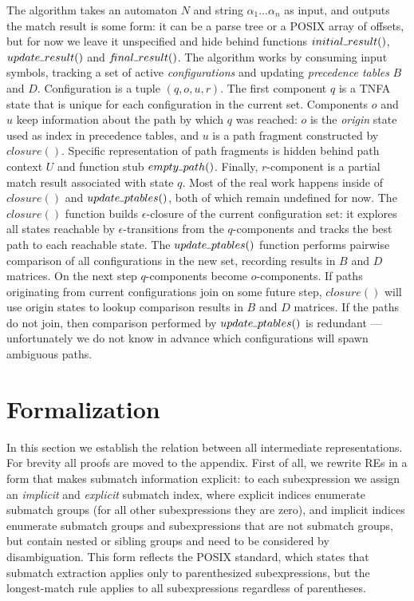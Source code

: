 \documentclass[AMA,STIX1COL]{WileyNJD-v2}
\newcommand{\Xund}{\rule{.4em}{.4pt}}
\begin{document}
The algorithm takes an automaton $N$ and string $\alpha_1 \!\hdots\! \alpha_n$ as input,
and outputs the match result is some form: it can be a parse tree or a POSIX array of offsets,
but for now we leave it unspecified and hide behind functions
$initial \Xund result ()$, $update \Xund result ()$ and $f\!inal \Xund result ()$.
The algorithm works by consuming input symbols,
tracking a set of active \emph{configurations}
and updating \emph{precedence tables} $B$ and $D$.
Configuration is a tuple $(q, o, u, r)$.
The first component $q$ is a TNFA state that is unique for each configuration in the current set.
Components $o$ and $u$ keep information about the path by which $q$ was reached:
$o$ is the \emph{origin} state used as index in precedence tables,
and $u$ is a path fragment constructed by $closure()$.
Specific representation of path fragments is hidden behind path context $U$ and function stub $empty \Xund path ()$.
Finally, $r$-component is a partial match result associated with state $q$.
Most of the real work happens inside of $closure()$ and $update \Xund ptables ()$, both of which remain undefined for now.
The $closure()$ function builds $\epsilon$-closure of the current configuration set:
it explores all states reachable by $\epsilon$-transitions from the $q$-components
and tracks the best path to each reachable state.
The $update \Xund ptables ()$ function
performs pairwise comparison of all configurations in the new set,
recording results in $B$ and $D$ matrices.
On the next step $q$-components become $o$-components.
If paths originating from current configurations join on some future step,
$closure ()$ will use origin states to lookup comparison results in $B$ and $D$ matrices.
If the paths do not join, then comparison performed by $update \Xund ptables ()$ is redundant ---
unfortunately we do not know in advance which configurations will spawn ambiguous paths.
\\


\section{Formalization}\label{section_formalization}

In this section we establish the relation between all intermediate representations.
For brevity all proofs are moved to the appendix.
%
First of all, we rewrite REs in a form that makes submatch information explicit:
to each subexpression we assign an \emph{implicit} and \emph{explicit} submatch index, where
explicit indices enumerate submatch groups (for all other subexpressions they are zero),
and implicit indices enumerate submatch groups and subexpressions that are not submatch groups,
but contain nested or sibling groups and need to be considered by disambiguation.
This form reflects the POSIX standard, which states that
submatch extraction applies only to parenthesized subexpressions,
but the longest-match rule applies to all subexpressions regardless of parentheses.
\end{document}
